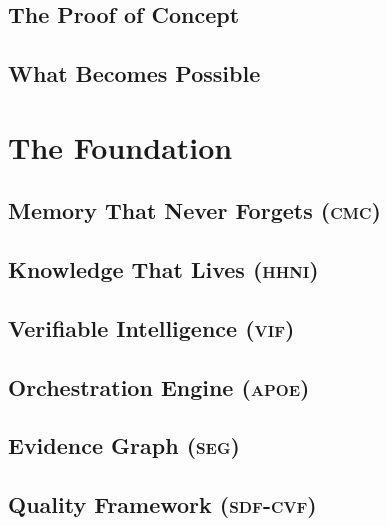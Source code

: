 \documentclass[11pt,a4paper,twoside]{book}
\newcommand{\cmc}{\textsc{cmc}}
\newcommand{\hhni}{\textsc{hhni}}
\newcommand{\vif}{\textsc{vif}}
\newcommand{\apoe}{\textsc{apoe}}
\newcommand{\seg}{\textsc{seg}}
\newcommand{\sdfcvf}{\textsc{sdf-cvf}}
\theoremstyle{definition}
\theoremstyle{remark}
\begin{document}
\chapter{The Proof of Concept}
\label{ch:proof}


\chapter{What Becomes Possible}
\label{ch:possible}


\part{The Foundation}

\chapter{Memory That Never Forgets (\cmc)}
\label{ch:cmc}


\chapter{Knowledge That Lives (\hhni)}
\label{ch:hhni}


\chapter{Verifiable Intelligence (\vif)}
\label{ch:vif}


\chapter{Orchestration Engine (\apoe)}
\label{ch:apoe}


\chapter{Evidence Graph (\seg)}
\label{ch:seg}


\chapter{Quality Framework (\sdfcvf)}
\label{ch:sdfcvf}

\end{document}
